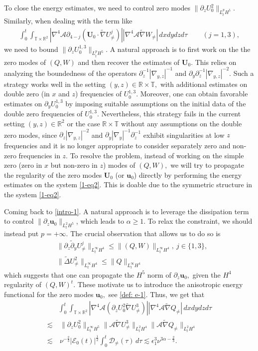 \documentclass[11pt,reqno]{article}
\numberwithin{equation}{section}
\newcommand\R{{\mathbb R}}
\newcommand\T{{\mathbb T}}
\newcommand\D{{\mathcal D}}
\newcommand\E{{\mathcal E}}
\newcommand\A{\mathcal{A}}
\newcommand\uu{\bm{u}}
\newcommand\U{\bm{U}}
\let\pa=\partial
\let\na=\nabla
\let\al=\alpha
\let\f=\frac
\let\ep=\epsilon
\begin{document}
To close the energy estimates, we need to control zero modes $\|\pa_{z}U_{0}^2 \|_{L^p_tH^5}$. Similarly, when dealing with the term like 
\begin{align*}
\int_0^t\int_{\T\times\R^2}
|\nabla^4\A\pa_{4-j}(\U_{0}\cdot\widetilde{\nabla}  U^j_{\not=})| |\nabla^4\A\widetilde{\nabla}W_{\not=}|\,dxdydzd\tau \qquad \,(j=1,3),
\end{align*}
 we need to bound $\|\pa_{z}U_{0}^{1,3} \|_{L^p_tH^5}.$ 
A natural approach is to first work on the the zero modes of $(Q, W)$ and then recover the estimates of $\U_0$. 
This relies on analyzing the boundedness of the operators
$\pa_z^{-1} |\na_{y,z}|^{-1}$ and ${\pa_y\pa_{z}^{-1}|\na_{y,z}|^{-2}}.$ 
Such a strategy works well in the setting $(y,z)\in \R\times \T,$ with additional estimates on double zero (in $x$ and $z$) frequencies of $U_{0}^{1,3}.$ Moreover, one can obtain favorable estimates on $\pa_y U_{0}^{1,3}$ 
by imposing suitable assumptions on the initial data of the double zero frequencies of $U_{0}^{1,3}.$ Nevertheless, this strategy fails in the current setting $(y,z)\in\R^2$ or the case $\R\times \T$ without any assumptions on the double zero modes, since $\pa_z |\na_{y,z}|^{-2}$ and 
${\pa_y|\nabla_y|^{-1}\pa_{z}^{-1}}$ exhibit singularities at low $z$ frequencies and it is no longer appropriate to consider separately zero and non-zero frequencies in $z.$ 
To resolve the problem, instead of working on the simple zero (zero in $x$ but non-zero in $z$) modes of $(Q, W),$ we will try to propagate the regularity of the zero modes $\U_0$ (or $\uu_0$) directly by performing the energy estimates on the system \eqref{1-eq2}. 
This is doable due to the symmetric structure in the system 
\eqref{1-eq2}.  

Coming back to \eqref{intro-1}. A natural approach is to leverage the dissipation term to control $\|\pa_{z} \uu_{0} \|_{L_t^2H^5}$, which leads to 
$\alpha\geq 1$. To relax the constraint, 
we should instead put $p=+\infty.$ 
The crucial observation that allows us to do so is
\begin{align*} 
	&\|\pa_z\tilde{\pa}_yU_{\not=}^j\|_{L^\infty_tH^4} \leq \|(Q, W)\|_{L^\infty_tH^4},~j\in\{1,3\},
	\\
	&\|\widetilde{\Delta}U_{\not=}^2\|_{L^\infty_tH^4} \leq \|Q\|_{L^\infty_tH^4}
\end{align*} 
which suggests that one can propagate the $H^5$ norm of $\pa_z \uu_0,$ given the $H^4$ regularity of $(Q,W)^t.$ 
These motivate us to introduce the anisotropic energy functional for the zero modes $\uu_0,$ see \eqref{def: e-1}.
Thus, we get that
\begin{align*}
    &\int_0^t\int_{\T\times\R^2}	|\nabla^4\A(\pa_z U_{0}^2\widetilde{\nabla}U_{\not=}^3)| |\nabla^4\A\widetilde{\nabla}Q_{\not=}|\,dxdydz d\tau
    \\
    \lesssim &~	\|\pa_{z}U_{0}^2 \|_{L^\infty_tH^5}  
    \|\A \widetilde{\nabla}U_{\not=}^3\|_{L^{2}_tH^4} \|\A\widetilde{\nabla}Q_{\not=}\|_{L^2_tH^4}
    \\
    \lesssim&~ \nu^{-\f23} |\E_{0}(t)|^{\f12} \int_0^t\D_{\not=}(\tau)\,d\tau
   \lesssim  \ep_1^3\nu^{3\al-\f23}.
\end{align*}
\end{document}
